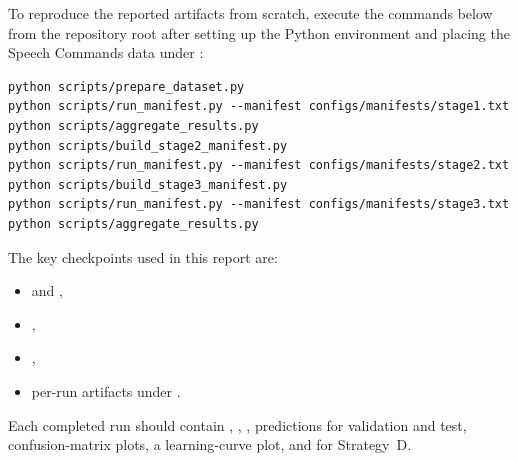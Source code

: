 \documentclass[11pt]{article}
\begin{document}
To reproduce the reported artifacts from scratch, execute the commands below from the repository root after setting up the Python environment and placing the Speech Commands data under :

\begin{verbatim}
python scripts/prepare_dataset.py
python scripts/run_manifest.py --manifest configs/manifests/stage1.txt
python scripts/aggregate_results.py
python scripts/build_stage2_manifest.py
python scripts/run_manifest.py --manifest configs/manifests/stage2.txt
python scripts/build_stage3_manifest.py
python scripts/run_manifest.py --manifest configs/manifests/stage3.txt
python scripts/aggregate_results.py
\end{verbatim}

The key checkpoints used in this report are:
\begin{itemize}[leftmargin=*]
    \item {} and ,
    \item {},
    \item {},
    \item per-run artifacts under .
\end{itemize}

Each completed run should contain , , , predictions for validation and test, confusion-matrix plots, a learning-curve plot, and  for Strategy~D. 
\end{document}
